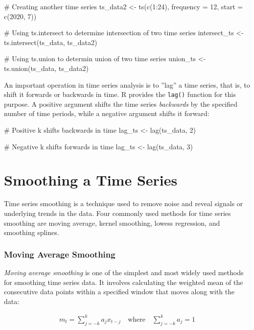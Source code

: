 \begin{samepage}
\begin{Rcode}
# Creating another time series
ts_data2 <- ts(c(1:24), frequency = 12, start = c(2020, 7))

# Using ts.intersect to determine intersection of two time series
intersect_ts <- ts.intersect(ts_data, ts_data2)

# Using ts.union to determin union of two time series
union_ts <- ts.union(ts_data, ts_data2)
\end{Rcode}
\end{samepage}

An important operation in time series analysis is to ''lag'' a time series, that is, to shift it forwards or backwards in time. R provides the \texttt{lag()} function for this purpose. A positive argument shifts the time series \emph{backwards} by the specified number of time periods, while a negative argument shifts it forward:

\begin{samepage}
\begin{Rcode}
# Positive k shifts backwards in time
lag_ts <- lag(ts_data, 2)

# Negative k shifts forwards in time
lag_ts <- lag(ts_data, 3)
\end{Rcode}
\end{samepage}

\section{Smoothing a Time Series}

Time series smoothing is a technique used to remove noise and reveal signals or underlying trends in the data. Four commonly used methods for time series smoothing are moving average, kernel smoothing, lowess regression, and smoothing splines. 

\subsubsection*{Moving Average Smoothing}

\emph{Moving average smoothing} is one of the simplest and most widely used methods for smoothing time series data. It involves calculating the weighted mean of the consecutive data points within a specified window that moves along with the data:

\begin{align*}m_t = \sum_{j=-k}^k a_j x_{t-j} \quad \text{where} \quad
\sum_{j=-k}^k a_j = 1
\end{align*}

